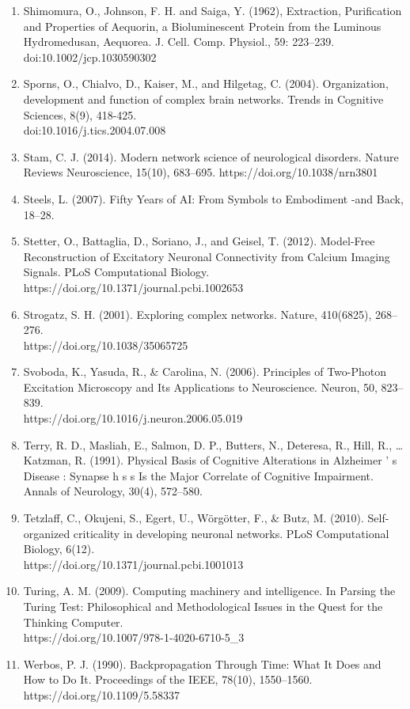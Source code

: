 \documentclass[11pt,titlepage]{article}
\begin{document}
\begin{spacing}{1}
\begin{enumerate}
\item Shimomura, O., Johnson, F. H. and Saiga, Y. (1962), Extraction, Purification and Properties of Aequorin, a Bioluminescent Protein from the Luminous Hydromedusan, Aequorea. J. Cell. Comp. Physiol., 59: 223–239. doi:10.1002/jcp.1030590302
\item Sporns, O., Chialvo, D., Kaiser, M., and Hilgetag, C. (2004). Organization, development and function of complex brain networks. Trends in Cognitive Sciences, 8(9), 418-425. \\doi:10.1016/j.tics.2004.07.008
\item Stam, C. J. (2014). Modern network science of neurological disorders. Nature Reviews Neuroscience, 15(10), 683–695. https://doi.org/10.1038/nrn3801
\item Steels, L. (2007). Fifty Years of AI: From Symbols to Embodiment -and Back, 18–28.
\item Stetter, O., Battaglia, D., Soriano, J., and Geisel, T. (2012). Model-Free Reconstruction of Excitatory Neuronal Connectivity from Calcium Imaging Signals. PLoS Computational Biology. https://doi.org/10.1371/journal.pcbi.1002653
\item Strogatz, S. H. (2001). Exploring complex networks. Nature, 410(6825), 268–276.\\https://doi.org/10.1038/35065725
\item Svoboda, K., Yasuda, R., \& Carolina, N. (2006). Principles of Two-Photon Excitation Microscopy and Its Applications to Neuroscience. Neuron, 50, 823–839.\\https://doi.org/10.1016/j.neuron.2006.05.019
\item Terry, R. D., Masliah, E., Salmon, D. P., Butters, N., Deteresa, R., Hill, R., … Katzman, R. (1991). Physical Basis of Cognitive Alterations in Alzheimer ’ s Disease : Synapse h s s Is the Major Correlate of Cognitive Impairment. Annals of Neurology, 30(4), 572–580.
\item Tetzlaff, C., Okujeni, S., Egert, U., Wörgötter, F., \& Butz, M. (2010). Self-organized criticality in developing neuronal networks. PLoS Computational Biology, 6(12).\\https://doi.org/10.1371/journal.pcbi.1001013
\item Turing, A. M. (2009). Computing machinery and intelligence. In Parsing the Turing Test: Philosophical and Methodological Issues in the Quest for the Thinking Computer.\\https://doi.org/10.1007/978-1-4020-6710-5\_3
\item Werbos, P. J. (1990). Backpropagation Through Time: What It Does and How to Do It. Proceedings of the IEEE, 78(10), 1550–1560. https://doi.org/10.1109/5.58337

\end{enumerate}
\end{spacing}
\end{document}
